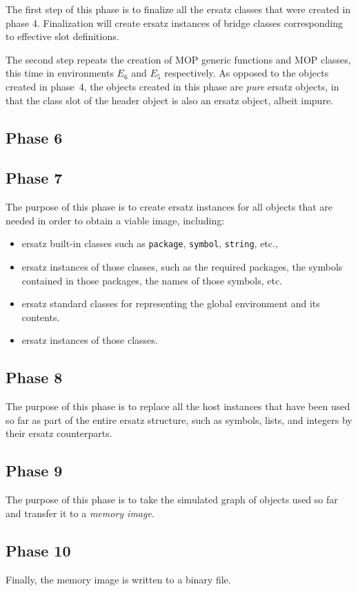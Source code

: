 The first step of this phase is to finalize all the ersatz classes
that were created in phase 4.  Finalization will create ersatz
instances of bridge classes corresponding to effective slot
definitions. 

The second step repeats the creation of MOP generic functions and MOP
classes, this time in environments $E_6$ and $E_5$ respectively.  As
opposed to the objects created in phase~4, the objects created in this
phase are \emph{pure} ersatz objects, in that the class slot of the
header object is also an ersatz object, albeit impure.

\subsection{Phase 6}

\subsection{Phase 7}

The purpose of this phase is to create ersatz instances for all
objects that are needed in order to obtain a viable image, including: 

\begin{itemize}
\item ersatz built-in classes such as \texttt{package}, \texttt{symbol},
  \texttt{string}, etc., 
\item ersatz instances of those classes, such as the required
  packages, the symbols contained in those packages, the names of
  those symbols, etc.
\item ersatz standard classes for representing the global environment
  and its contents.
\item ersatz instances of those classes.
\end{itemize}

\subsection{Phase 8}

The purpose of this phase is to replace all the host instances that
have been used so far as part of the entire ersatz structure, such as
symbols, lists, and integers by their ersatz counterparts.

\subsection{Phase 9}

The purpose of this phase is to take the simulated graph of objects
used so far and transfer it to a \emph{memory image}.  

\subsection{Phase 10}

Finally, the memory image is written to a binary file. 
